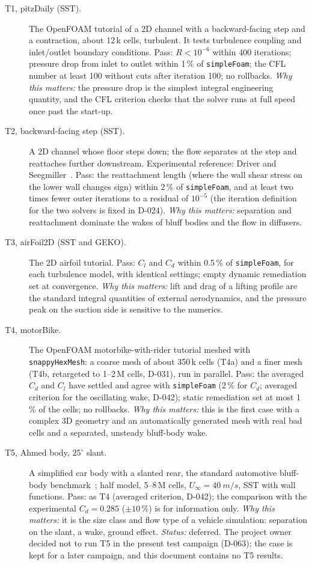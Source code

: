 \documentclass[11pt,a4paper]{article}
\newcommand{\code}[1]{\texttt{#1}}
\begin{document}
\begin{description}
\item[T1, pitzDaily (SST).] The OpenFOAM tutorial of a 2D channel with a
  backward-facing step and a contraction, about 12\,k cells, turbulent. It
  tests turbulence coupling and inlet/outlet boundary conditions. Pass:
  $R<10^{-6}$ within 400 iterations; pressure drop from inlet to outlet
  within 1\,\% of \code{simpleFoam}; the CFL number at least 100 without
  cuts after iteration 100; no rollbacks. \emph{Why this matters:} the
  pressure drop is the simplest integral engineering quantity, and the CFL
  criterion checks that the solver runs at full speed once past the
  start-up.
\item[T2, backward-facing step (SST).] A 2D channel whose floor steps down;
  the flow separates at the step and reattaches further downstream.
  Experimental reference: Driver and Seegmiller~\cite{Driver1985}. Pass: the
  reattachment length (where the wall shear stress on the lower wall changes
  sign) within 2\,\% of \code{simpleFoam}, and at least two times fewer
  outer iterations to a residual of $10^{-5}$ (the iteration definition for
  the two solvers is fixed in D-024). \emph{Why this matters:}
  separation and reattachment dominate the wakes of bluff bodies and the
  flow in diffusers.
\item[T3, airFoil2D (SST and GEKO).] The 2D airfoil tutorial. Pass: $C_l$
  and $C_d$ within 0.5\,\% of \code{simpleFoam}, for each turbulence model,
  with identical settings; empty dynamic remediation set at convergence.
  \emph{Why this matters:} lift and drag of a lifting profile are the
  standard integral quantities of external aerodynamics, and the pressure
  peak on the suction side is sensitive to the numerics.
\item[T4, motorBike.] The OpenFOAM motorbike-with-rider tutorial meshed with
  \code{snappyHexMesh}: a coarse mesh of about 350\,k cells (T4a) and a
  finer mesh (T4b, retargeted to 1--2\,M cells, D-031), run in parallel.
  Pass: the averaged $C_d$ and $C_l$ have settled and agree with
  \code{simpleFoam} (2\,\% for $C_d$; averaged criterion for the oscillating
  wake, D-042); static remediation set at most 1\,\% of the cells; no
  rollbacks. \emph{Why this matters:} this is the first case with a
  complex 3D geometry and an automatically generated mesh with real
  bad cells and a separated, unsteady bluff-body wake.
\item[T5, Ahmed body, $25^\circ$ slant.] A simplified car body with a slanted
  rear, the standard automotive bluff-body benchmark~\cite{Ahmed1984}; half
  model, 5--8\,M cells, $U_\infty=\SI{40}{m/s}$, SST with wall functions.
  Pass: as T4 (averaged criterion, D-042); the comparison with the
  experimental $C_d=0.285$ ($\pm10$\,\%) is for information only.
  \emph{Why this matters:} it is the size class and flow type of a
  vehicle simulation: separation on the slant, a wake, ground effect.
  \emph{Status:} deferred. The project owner decided not to run T5 in the
  present test campaign (D-063); the case is kept for a later campaign,
  and this document contains no T5 results.
\end{description}
\end{document}
